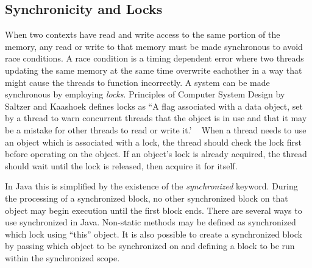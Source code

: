 \documentclass{sig-alternate}
\begin{document}

\subsection{Synchronicity and Locks}
\label{sec:locks}

When two contexts have read and write access to the same portion of the memory, any read or write to that memory must be made synchronous to avoid race conditions. A race condition is a timing dependent error where two threads updating the same memory at the same time overwrite eachother in a way that might cause the threads to function incorrectly. A system can be made synchronous by employing \emph{locks}. Principles of Computer System Design by Saltzer and Kaashoek defines locks as ``A flag associated with a data object, set by a thread to warn concurrent threads that the object is in use and that it may be a mistake for other threads to read or write it.' ~\cite{Systems}
When a thread needs to use an object which is associated with a lock, the thread should check the lock first before operating on the object. If an object's lock is already acquired, the thread should wait until the lock is released, then acquire it for itself.

In Java this is simplified by the existence of the \emph{synchronized} keyword. During the processing of a synchronized block, no other synchronized block on that object may begin execution until the first block ends. There are several ways to use synchronized in Java. Non-static methods may be defined as synchronized which lock using ``this'' object. It is also possible to create a synchronized block by passing which object to be synchronized on and defining a block to be run within the synchronized scope.~\cite{JavaLangSpec}
\end{document}

